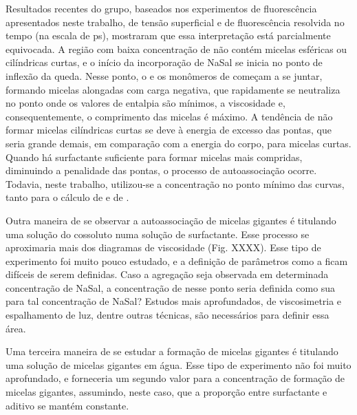 		Resultados recentes do grupo, baseados nos experimentos de fluorescência apresentados neste trabalho, de tensão superficial e de fluorescência resolvida no tempo (na escala de ps), mostraram que essa interpretação está parcialmente equivocada. A região com baixa concentração de \TTAB{} não contém micelas esféricas ou cilíndricas curtas, e o início da incorporação de NaSal se inicia no ponto de inflexão da queda. Nesse ponto, o \Sal{} e os monômeros de \TTAB{} começam a se juntar, formando micelas alongadas com carga negativa, que rapidamente se neutraliza no ponto onde os valores de entalpia são mínimos, a viscosidade e, consequentemente, o comprimento das micelas é máximo. A tendência de não formar micelas cilíndricas curtas se deve à energia de excesso das pontas, que seria grande demais, em comparação com a energia do corpo, para micelas curtas. Quando há surfactante suficiente para formar micelas mais compridas, diminuindo a penalidade das pontas, o processo de autoassociação ocorre. %
		Todavia, neste trabalho, utilizou-se a concentração no ponto mínimo das curvas, tanto para o cálculo de \DHwlm{} e de \cwlm.
		
		Outra maneira de se observar a autoassociação de micelas gigantes é titulando uma solução do cossoluto numa solução de surfactante. Esse processo se aproximaria mais dos diagramas de viscosidade (Fig. XXXX). %
		Esse tipo de experimento foi muito pouco estudado, e a definição de parâmetros como a \cmc{} ficam difíceis de serem definidas. Caso a agregação seja observada em determinada concentração de NaSal, a concentração de \TTAB{} nesse ponto seria definida como sua \cwlm{} para tal concentração de NaSal? Estudos mais aprofundados, de viscosimetria e espalhamento de luz, dentre outras técnicas, são necessários para definir essa área.
		
		
		Uma terceira maneira de se estudar a formação de micelas gigantes é titulando uma solução de micelas gigantes em água. Esse tipo de experimento não foi muito aprofundado, e forneceria um segundo valor para a concentração de formação de micelas gigantes, assumindo, neste caso, que a proporção entre surfactante e aditivo se mantém constante.
		
